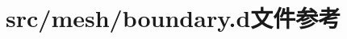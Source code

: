 \hypertarget{src_2mesh_2boundary_8d}{
\section{src/mesh/boundary.d文件参考}
\label{src_2mesh_2boundary_8d}
}
